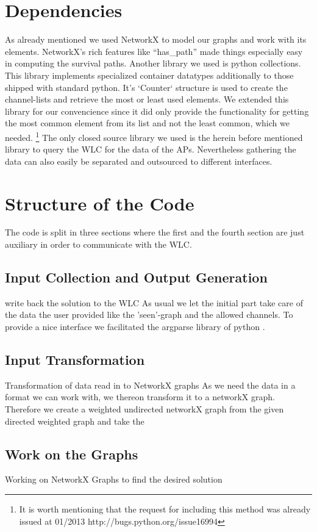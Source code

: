\section{Dependencies}
  As already mentioned we used NetworkX\cite{hagberg-2008-exploring} to model our graphs and work with its elements.
  NetworkX's rich features like ``has\_path'' made things especially easy in computing the survival paths.
  Another library we used is python collections. \cite{python_collections}
  This library implements specialized container datatypes additionally to those shipped with standard python.
  It's `Counter` structure is used to create the channel-lists and retrieve the most or least used elements.
  We extended this library for our convencience since it did only provide the functionality for getting the most common element from its list and not the least common,
  which we needed. \footnote{It is worth mentioning that the request for including this method was already issued at 01/2013 http://bugs.python.org/issue16994}
  The only closed source library we used is the herein before mentioned library to query the WLC for the data of the APs. Nevertheless gathering the data can also
  easily be separated and outsourced to different interfaces.
\section{Structure of the Code}
  The code is split in three sections where the first and the fourth section are just auxiliary in order to communicate with the \ac{WLC}.
  \subsection{Input Collection and Output Generation}
  write back the solution to the WLC
    As usual we let the initial part take care of the data the user provided like the 'seen'-graph and the allowed channels. To provide a nice interface we
    facilitated the argparse library of python \cite{argparse}.
  \subsection{Input Transformation} Transformation of data read in to NetworkX graphs
    As we need the data in a format we can work with, we thereon transform it to a networkX graph. 
    Therefore we create a weighted undirected networkX graph from the given directed weighted graph and take the 
   \subsection{Work on the Graphs} Working on NetworkX Graphs to find the desired solution
  

